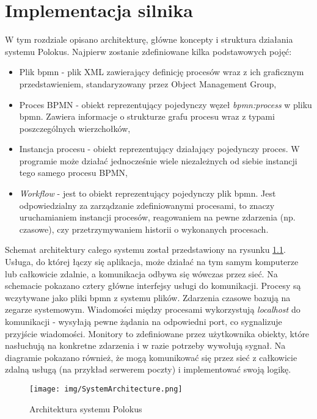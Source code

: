 \documentclass[declaration,shortabstract,mgr]{iithesis}
\newcommand{\bpmn}{BPMN }
\newcommand{\bpmnnospace}{BPMN}
\begin{document}
\chapter{Implementacja silnika}\label{chapter-implementation}
W tym rozdziale opisano architekturę, główne koncepty i struktura działania systemu Polokus. Najpierw zostanie zdefiniowane kilka podstawowych pojęć:
\begin{itemize}
    \setlength\itemsep{0em}
    \item Plik bpmn - plik XML zawierający definicję procesów wraz z ich graficznym przedstawieniem, standaryzowany przez Object Management Group,
    \item Proces \bpmn - obiekt reprezentujący pojedynczy węzeł \emph{bpmn:process} w pliku bpmn. Zawiera informacje o strukturze grafu procesu wraz z typami poszczególnych wierzchołków,
    \item Instancja procesu - obiekt reprezentujący działający pojedynczy proces. W programie może działać jednocześnie wiele niezależnych od siebie instancji tego samego procesu \bpmnnospace,
    \item \textit{Workflow} - jest to obiekt reprezentujący pojedynczy plik bpmn. Jest odpowiedzialny za zarządzanie zdefiniowanymi procesami, to znaczy uruchamianiem instancji procesów, reagowaniem na pewne zdarzenia (np. czasowe), czy przetrzymywaniem historii o wykonanych procesach.
\end{itemize}

Schemat architektury całego systemu został przedstawiony na rysunku \ref{fig:polokus-architecture}. Usługa, do której łączy się aplikacja, może działać na tym samym komputerze lub całkowicie zdalnie, a komunikacja odbywa się wówczas przez sieć. Na schemacie pokazano cztery główne interfejsy usługi do komunikacji. Procesy są wczytywane jako pliki bpmn z systemu plików. Zdarzenia czasowe bazują na zegarze systemowym. Wiadomości między procesami wykorzystują \textit{localhost} do komunikacji - wysyłają pewne żądania na odpowiedni port, co sygnalizuje przyjście wiadomości. Monitory to zdefiniowane przez użytkownika obiekty, które nasłuchują na konkretne zdarzenia i w razie potrzeby wywołują sygnał. Na diagramie pokazano również, że mogą komunikować się przez sieć z całkowicie zdalną usługą (na przykład serwerem poczty) i implementować swoją logikę.

\begin{figure}
    \texttt{[image: img/SystemArchitecture.png]}
    \caption{Architektura systemu Polokus}
    \label{fig:polokus-architecture}
\end{figure}
\end{document}
